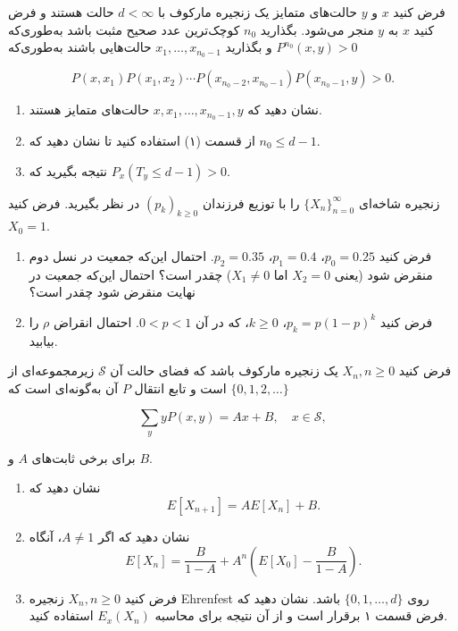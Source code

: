 \documentclass[11pt, a4, twoside]{article}
\begin{document}
	\begin{problem} %
		
		فرض کنید $x$ و $y$ حالت‌های متمایز یک زنجیره مارکوف با $d < \infty$ حالت هستند و فرض کنید $x$ به $y$ منجر می‌شود. بگذارید $n_0$ کوچک‌ترین عدد صحیح مثبت باشد به‌طوری‌که $P^{n_0}(x, y) > 0$ و بگذارید $x_1, \dots, x_{n_0-1}$ حالت‌هایی باشند به‌طوری‌که

		\[
		P(x, x_1) P(x_1, x_2) \cdots P(x_{n_0-2}, x_{n_0-1}) P(x_{n_0-1}, y) > 0.
		\]

		\begin{enumerate}
			\item نشان دهید که $x, x_1, \dots, x_{n_0-1}, y$ حالت‌های متمایز هستند.
			
			\item از قسمت (۱) استفاده کنید تا نشان دهید که $n_0 \leq d - 1$.
			
			\item نتیجه بگیرید که $P_x(T_y \leq d - 1) > 0$.
		\end{enumerate}

	\end{problem}
	
	\begin{problem} %
		
		زنجیره شاخه‌ای $\{X_n\}_{n=0}^{\infty}$ را با توزیع فرزندان $(p_k)_{k \geq 0}$ در نظر بگیرید. فرض کنید $X_0 = 1$.

		\begin{enumerate}
			\item فرض کنید $p_0 = 0.25$، $p_1 = 0.4$، $p_2 = 0.35$. احتمال این‌که جمعیت در نسل دوم منقرض شود (یعنی $X_2 = 0$ اما $X_1 \neq 0$) چقدر است؟ احتمال این‌که جمعیت در نهایت منقرض شود چقدر است؟
			
			\item فرض کنید $p_k = p(1 - p)^k$، $k \geq 0$، که در آن $0 < p < 1$. احتمال انقراض $\rho$ را بیابید.
		\end{enumerate}

	\end{problem}
	
	\begin{problem} %
		فرض کنید $X_n, n \geq 0$ یک زنجیره مارکوف باشد که فضای حالت آن $\mathcal{S}$ زیرمجموعه‌ای از $\{0,1,2,\dots\}$ است و تابع انتقال $P$ آن به‌گونه‌ای است که

		\[
		\sum_y y P(x, y) = A x + B, \quad x \in \mathcal{S},
		\]

		برای برخی ثابت‌های $A$ و $B$.

		\begin{enumerate}
			\item نشان دهید که 
			\[
			E [X_{n+1}] = A E [X_n] + B.
			\]
			
			\item نشان دهید که اگر $A \neq 1$، آنگاه
			\[
			E [X_n] = \frac{B}{1 - A} + A^n \left( E [X_0] - \frac{B}{1 - A} \right).
			\]
			
			\item فرض کنید $X_n, n \geq 0$ زنجیره Ehrenfest روی $\{0, 1, \dots, d\}$ باشد. نشان دهید که فرض قسمت ۱ برقرار است و از آن نتیجه برای محاسبه $E_x(X_n)$ استفاده کنید.
		\end{enumerate}

	\end{problem}
	
\end{document}
